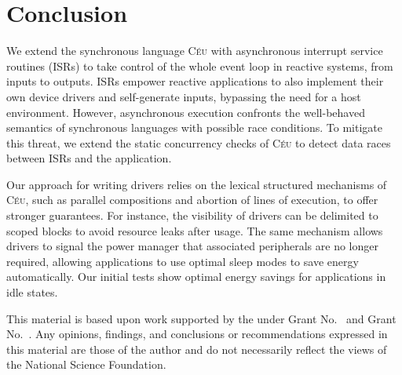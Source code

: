 \documentclass[sigplan,10pt,review,anonymous]{acmart}\settopmatter{printfolios=true,printccs=false,printacmref=false}
\newcommand{\CEU}{\textsc{C\'{e}u}\xspace}
\begin{document}
\section{Conclusion}

We extend the synchronous language \CEU with asynchronous interrupt service
routines (ISRs) to take control of the whole event loop in reactive systems,
from inputs to outputs.
%
ISRs empower reactive applications to also implement their own device drivers
and self-generate inputs, bypassing the need for a host environment.
%
However, asynchronous execution confronts the well-behaved semantics of
synchronous languages with possible race conditions.
%
To mitigate this threat, we extend the static concurrency checks of \CEU to
detect data races between ISRs and the application.

Our approach for writing drivers relies on the lexical structured mechanisms of
\CEU, such as parallel compositions and abortion of lines of execution, to
offer stronger guarantees.
%
For instance, the visibility of drivers can be delimited to scoped blocks to
avoid resource leaks after usage.
%
The same mechanism allows drivers to signal the power manager that associated
peripherals are no longer required, allowing applications to use optimal
sleep modes to save energy automatically.
%
Our initial tests show optimal energy savings for applications in idle states.

\begin{acks}                            %
  This material is based upon work supported by the
   under Grant
  No.~ and Grant
  No.~.  Any opinions, findings, and
  conclusions or recommendations expressed in this material are those
  of the author and do not necessarily reflect the views of the
  National Science Foundation.
\end{acks}


\end{document}
